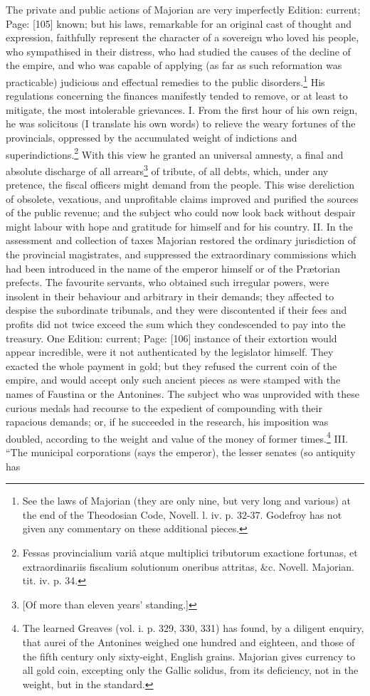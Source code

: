 The private and public actions of Majorian are very imperfectly Edition: current; Page: [105] known; but his laws, remarkable for an original cast of thought and expression, faithfully represent the character of a sovereign who loved his people, who sympathised in their distress, who had studied the causes of the decline of the empire, and who was capable of applying (as far as such reformation was practicable) judicious and effectual remedies to the public disorders.\footnote{See the laws of Majorian (they are only nine, but very long and various) at the end of the Theodosian Code, Novell. l. iv. p. 32-37. Godefroy has not given any commentary on these additional pieces.} His regulations concerning the finances manifestly tended to remove, or at least to mitigate, the most intolerable grievances. I. From the first hour of his own reign, he was solicitous (I translate his own words) to relieve the weary fortunes of the provincials, oppressed by the accumulated weight of indictions and superindictions.\footnote{Fessas provincialium variâ atque multiplici tributorum exactione fortunas, et extraordinariis fiscalium solutionum oneribus attritas, \&c. Novell. Majorian. tit. iv. p. 34.} With this view he granted an universal amnesty, a final and absolute discharge of all arrears\footnote{[Of more than eleven years\texthebrew{}’ standing.]} of tribute, of all debts, which, under any pretence, the fiscal officers might demand from the people. This wise dereliction of obsolete, vexatious, and unprofitable claims improved and purified the sources of the public revenue; and the subject who could now look back without despair might labour with hope and gratitude for himself and for his country. II. In the assessment and collection of taxes Majorian restored the ordinary jurisdiction of the provincial magistrates, and suppressed the extraordinary commissions which had been introduced in the name of the emperor himself or of the Prætorian prefects. The favourite servants, who obtained such irregular powers, were insolent in their behaviour and arbitrary in their demands; they affected to despise the subordinate tribunals, and they were discontented if their fees and profits did not twice exceed the sum which they condescended to pay into the treasury. One Edition: current; Page: [106] instance of their extortion would appear incredible, were it not authenticated by the legislator himself. They exacted the whole payment in gold; but they refused the current coin of the empire, and would accept only such ancient pieces as were stamped with the names of Faustina or the Antonines. The subject who was unprovided with these curious medals had recourse to the expedient of compounding with their rapacious demands; or, if he succeeded in the research, his imposition was doubled, according to the weight and value of the money of former times.\footnote{The learned Greaves (vol. i. p. 329, 330, 331) has found, by a diligent enquiry, that aurei of the Antonines weighed one hundred and eighteen, and those of the fifth century only sixty-eight, English grains. Majorian gives currency to all gold coin, excepting only the Gallic solidus, from its deficiency, not in the weight, but in the standard.} III. \texthebrew{“}The municipal corporations (says the emperor), the lesser senates (so antiquity has 
